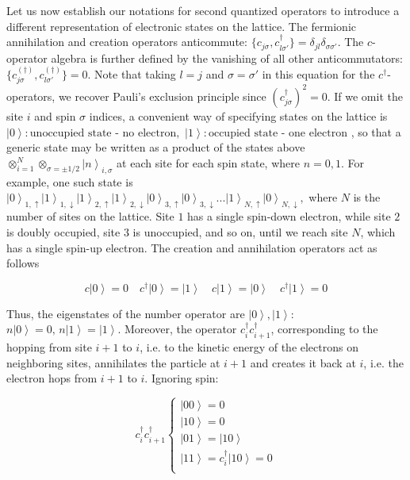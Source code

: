 Let us now establish our notations for second quantized operators to introduce a different representation of electronic states on the lattice.
The fermionic annihilation and creation operators anticommute:
$\{ c_{j\sigma} , c_{l \sigma'}^\dagger \} = \delta_{jl} \delta_{\sigma\sigma'}$.
The $c$-operator algebra is further defined by the vanishing of all other anticommutators:$
\{ c_{j\sigma}^{(\dagger)} , c_{l \sigma'}^{(\dagger)} \} = 0$.
Note that taking $l = j$ and $\sigma = \sigma'$ in this equation for the $c^\dagger$-operators, we recover Pauli's exclusion principle since $(c_{j\sigma}^\dagger)^2 = 0$.
If we omit the site $i$ and spin $\sigma$ indices, a convenient way of specifying states on the lattice is $
\left| 0 \right\rangle : \text{unoccupied state - no electron} , \,\,  \left| 1 \right\rangle : \text{occupied state - one electron}
$
, so that a generic state may be written as a product of the states above $\otimes_{i=1}^{N} \otimes_{\sigma = \pm 1/2} \left| n \right\rangle_{i, \sigma}$ at each site for each spin state, where $n= 0, 1$.
For example, one such state is
$
\left| 0 \right\rangle_{1, \uparrow} \left| 1 \right\rangle_{1, \downarrow} \left| 1 \right\rangle_{2, \uparrow} \left| 1 \right\rangle_{2, \downarrow} \left| 0 \right\rangle_{3, \uparrow} \left| 0 \right\rangle_{3, \downarrow} ... \left| 1 \right\rangle_{N, \uparrow} \left| 0 \right\rangle_{N, \downarrow}  ,
$
 where $N$ is the number of sites on the lattice. Site $1$ has a single spin-down electron, while site $2$ is doubly occupied, site $3$ is unoccupied, and so on, until we reach site $N$, which has a single spin-up electron.
The creation and annihilation operators act as follows

\begin{equation}
c \left| 0 \right\rangle = 0 \quad c^\dagger \left| 0 \right\rangle = \left| 1 \right\rangle \quad c \left| 1 \right\rangle = \left| 0 \right\rangle \quad c^\dagger \left| 1 \right\rangle = 0
\end{equation}

Thus, the eigenstates of the number operator are $\left| 0 \right\rangle, \left| 1 \right\rangle$: $
n \left| 0 \right\rangle = 0 , \, n \left| 1 \right\rangle = \left| 1 \right\rangle
$.
Moreover, the operator $c_i^\dagger c_{i+1}^\dagger$, corresponding to the hopping from site $i+1$ to $i$, i.e. to the kinetic energy of the electrons on neighboring sites, annihilates the particle at $i+1$ and creates it back at $i$, i.e. the electron hops from $i+1$ to $i$.
Ignoring spin:

\begin{equation}
c_i^\dagger c_{i+1}^\dagger \begin{cases}
\left|0 0 \right\rangle = 0 \\
\left|1 0 \right\rangle =  0 \\
\left|0 1 \right\rangle =  \left| 1 0 \right\rangle \\
\left|1 1 \right\rangle =  c_i^\dagger \left| 1 0  \right\rangle = 0 \\
\end{cases}
\end{equation}

